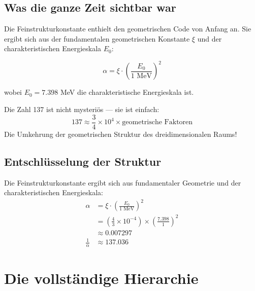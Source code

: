 	\subsection{Was die ganze Zeit sichtbar war}
	
	Die Feinstrukturkonstante enthielt den geometrischen Code von Anfang an. Sie ergibt sich aus der fundamentalen geometrischen Konstante $\xi$ und der charakteristischen Energieskala $E_0$:
	
	\begin{equation}
		\alpha = \xi \cdot \left(\frac{E_0}{1 \text{ MeV}}\right)^2
	\end{equation}
	
	wobei $E_0 = 7.398$ MeV die charakteristische Energieskala ist.
	
	\begin{tcolorbox}[colback=blue!5!white,colframe=blue!75!black,title=Erkenntnis]
		Die Zahl 137 ist nicht mysteriös — sie ist einfach:
		\begin{equation}
			137 \approx \frac{3}{4} \times 10^4 \times \text{geometrische Faktoren}
		\end{equation}
		Die Umkehrung der geometrischen Struktur des dreidimensionalen Raums!
	\end{tcolorbox}
	
	\subsection{Entschlüsselung der Struktur}
	
	\begin{tcolorbox}[colback=red!5!white,colframe=red!75!black,title=Die vollständige Entschlüsselung]
		Die Feinstrukturkonstante ergibt sich aus fundamentaler Geometrie und der charakteristischen Energieskala:
		\begin{align}
			\alpha &= \xi \cdot \left(\frac{E_0}{1 \text{ MeV}}\right)^2 \\
			&= \left(\frac{4}{3} \times 10^{-4}\right) \times \left(\frac{7.398}{1}\right)^2 \\
			&\approx 0.007297 \\
			\frac{1}{\alpha} &\approx 137.036
		\end{align}
	\end{tcolorbox}
	
	\section{Die vollständige Hierarchie}
	
